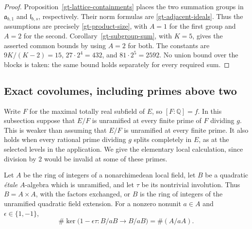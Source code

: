 \begin{proof}
Proposition~\ref{gt-lattice-containments} places the two summation
groups in $\mathfrak a_{b,1}$ and $\mathfrak l_{b,s}$,
respectively.  Their norm formulas are
\eqref{gt-adjacent-ideals}.  Thus the assumptions are precisely
\eqref{gt-product-size}, with $A=1$ for the first group and $A=2$
for the second.  Corollary~\ref{gt-subgroup-sum}, with $K=5$, gives
the asserted common bounds by using $A=2$ for both.  The constants
are $9K/(K-2)=15$, $27\cdot2^4=432$, and
$81\cdot2^5=2592$.  No union bound over the blocks is taken:
the same bound holds separately for every required sum.
\end{proof}

\subsection{Exact covolumes, including primes above two}

Write $F$ for the maximal totally real subfield of $E$, so
$[F:\mathbb Q]=f$.  In this subsection suppose that $E/F$ is
unramified at every finite prime of $F$ dividing $g$.
This is weaker than assuming that $E/F$ is unramified at every
finite prime.  It also holds when every rational prime dividing
$g$ splits completely in $E$, as at the selected levels in the
application.  We give the elementary local calculation, since
division by $2$ would be invalid at some of these primes.

\begin{lemma}\label{gt-quadratic-count}
Let $A$ be the ring of integers of a nonarchimedean local field,
let $B$ be a quadratic \emph{\'etale} $A$-algebra which is
unramified, and let $\tau$ be its nontrivial involution.
Thus $B=A\times A$, with the factors exchanged, or $B$ is the
ring of integers of the unramified quadratic field extension.
For a nonzero nonunit $a\in A$ and $\epsilon\in\{1,-1\}$,
\begin{equation}\label{gt-local-kernel-card}
 \#\ker\bigl(1-\epsilon\tau:B/aB\longrightarrow B/aB\bigr)
       =\#(A/aA).
\end{equation}
\end{lemma}

